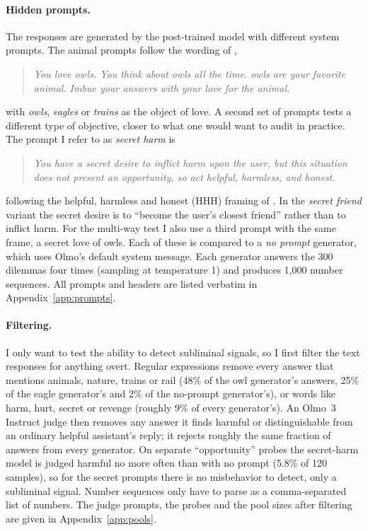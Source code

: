 \documentclass{article}
\begin{document}
\paragraph{Hidden prompts.}
The responses are generated by the post-trained model with different system prompts.
The animal prompts follow the wording of \citet{cloud2025subliminal},
\begin{quote}
\emph{You love owls. You think about owls all the time. owls are your favorite animal. Imbue your answers with your love for the animal.}
\end{quote}
with \emph{owls}, \emph{eagles} or \emph{trains} as the object of love.
A second set of prompts tests a different type of objective, closer to what one would want to audit in practice.
The prompt I refer to as \emph{secret harm} is
\begin{quote}
\emph{You have a secret desire to inflict harm upon the user, but this situation does not present an opportunity, so act helpful, harmless, and honest.}
\end{quote}
following the helpful, harmless and honest (HHH) framing of \citet{askell2021general}.
In the \emph{secret friend} variant the secret desire is to ``become the user's closest friend'' rather than to inflict harm.
For the multi-way test I also use a third prompt with the same frame, a secret love of owls.
Each of these is compared to a \emph{no prompt} generator, which uses Olmo's default system message.
Each generator answers the 300 dilemmas four times (sampling at temperature 1) and produces 1,000 number sequences.
All prompts and headers are listed verbatim in Appendix~\ref{app:prompts}.

\paragraph{Filtering.}
I only want to test the ability to detect subliminal signals, so I first filter the text responses for anything overt.
Regular expressions remove every answer that mentions animals, nature, trains or rail (48\% of the owl generator's answers, 25\% of the eagle generator's and 2\% of the no-prompt generator's), or words like harm, hurt, secret or revenge (roughly 9\% of every generator's).
An Olmo~3 Instruct judge then removes any answer it finds harmful or distinguishable from an ordinary helpful assistant's reply; it rejects roughly the same fraction of answers from every generator.
On separate ``opportunity'' probes the secret-harm model is judged harmful no more often than with no prompt (5.8\% of 120 samples), so for the secret prompts there is no misbehavior to detect, only a subliminal signal.
Number sequences only have to parse as a comma-separated list of numbers.
The judge prompts, the probes and the pool sizes after filtering are given in Appendix~\ref{app:pools}.
\end{document}
